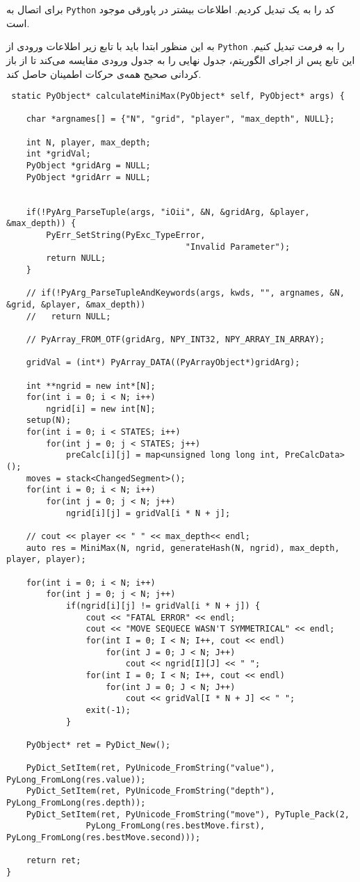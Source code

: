 برای اتصال به 
 \verb;Python;
 کد را به یک
 تبدیل کردیم.
 اطلاعات بیشتر در پاورقی موجود است.

به این منظور ابتدا باید با تابع زیر اطلاعات ورودی از 
\verb;Python;
را به فرمت
تبدیل کنیم.
این تابع پس از اجرای الگوریتم، جدول نهایی را به جدول ورودی مقایسه می‌کند تا از باز کردانی صحیح همه‌ی حرکات اطمینان حاصل کند.

 \begin{latin}
 \begin{lstlisting}
 static PyObject* calculateMiniMax(PyObject* self, PyObject* args) {

	char *argnames[] = {"N", "grid", "player", "max_depth", NULL};

	int N, player, max_depth;
	int *gridVal;
	PyObject *gridArg = NULL;
	PyObject *gridArr = NULL;


	if(!PyArg_ParseTuple(args, "iOii", &N, &gridArg, &player, &max_depth)) {
		PyErr_SetString(PyExc_TypeError,
									"Invalid Parameter");
		return NULL;
	}

	// if(!PyArg_ParseTupleAndKeywords(args, kwds, "", argnames, &N, &grid, &player, &max_depth))
	//   return NULL;
	
	// PyArray_FROM_OTF(gridArg, NPY_INT32, NPY_ARRAY_IN_ARRAY);

	gridVal = (int*) PyArray_DATA((PyArrayObject*)gridArg);

	int **ngrid = new int*[N];
	for(int i = 0; i < N; i++)
		ngrid[i] = new int[N];
	setup(N);
	for(int i = 0; i < STATES; i++)
		for(int j = 0; j < STATES; j++)
			preCalc[i][j] = map<unsigned long long int, PreCalcData>();
	moves = stack<ChangedSegment>();
	for(int i = 0; i < N; i++)
		for(int j = 0; j < N; j++)
			ngrid[i][j] = gridVal[i * N + j];

	// cout << player << " " << max_depth<< endl;
	auto res = MiniMax(N, ngrid, generateHash(N, ngrid), max_depth, player, player);

	for(int i = 0; i < N; i++)
		for(int j = 0; j < N; j++)
			if(ngrid[i][j] != gridVal[i * N + j]) {
				cout << "FATAL ERROR" << endl;
				cout << "MOVE SEQUECE WASN'T SYMMETRICAL" << endl;
				for(int I = 0; I < N; I++, cout << endl)
					for(int J = 0; J < N; J++)
						cout << ngrid[I][J] << " ";
				for(int I = 0; I < N; I++, cout << endl)
					for(int J = 0; J < N; J++)
						cout << gridVal[I * N + J] << " ";
				exit(-1);
			}

	PyObject* ret = PyDict_New();

	PyDict_SetItem(ret, PyUnicode_FromString("value"), PyLong_FromLong(res.value));
	PyDict_SetItem(ret, PyUnicode_FromString("depth"), PyLong_FromLong(res.depth));
	PyDict_SetItem(ret, PyUnicode_FromString("move"), PyTuple_Pack(2, 
				PyLong_FromLong(res.bestMove.first), PyLong_FromLong(res.bestMove.second)));

	return ret;
}
 \end{lstlisting}
 \end{latin}
 
